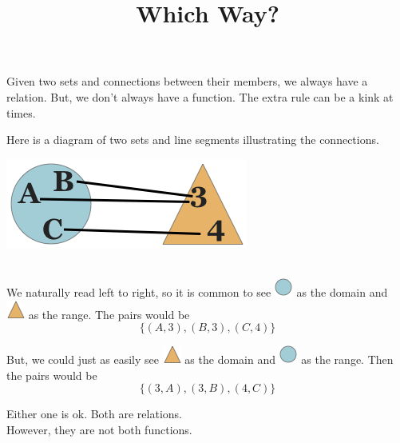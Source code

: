 \documentclass{ximera}
\title{Which Way?}
\begin{document}
\begin{abstract}
\end{abstract}

\maketitle





Given two sets and connections between their members, we always have a relation. But, we don't always have a function. The extra rule can be a kink at times. 


\begin{example}
Here is a diagram of two sets and line segments illustrating the connections.

\begin{center}
\includegraphics{pics/func.png}
\end{center}
\quad \\


We naturally read left to right, so it is common to see \includegraphics{pics/circle.png} as the domain and \includegraphics{pics/triangle.png} as the range.  The pairs would be 
\[
\{ (A, 3), (B, 3), (C, 4) \}
\]


But, we could just as easily see \includegraphics{pics/triangle.png} as the domain and \includegraphics{pics/circle.png} as the range.  Then the pairs would be
\[
\{ (3, A), (3, B), (4, C) \}
\]


Either one is ok. Both are relations. \\
However, they are not both functions. \\
\quad \\


\end{example}
\end{document}
